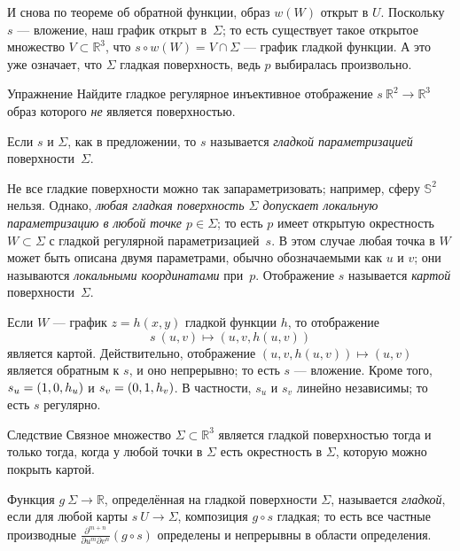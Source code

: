 И снова по теореме об обратной функции, образ $w(W)$ открыт в $U$.
Поскольку $s$ --- вложение, наш график открыт в~$\Sigma$;
то есть существует такое открытое множество $V\subset \mathbb{R}^3$, что $s\circ w(W)=V\cap \Sigma$ --- график гладкой функции.
А это уже означает, что $\Sigma$ гладкая поверхность, ведь $p$ выбиралась произвольно.
\qeds


\begin{thm}{Упражнение}\label{ex:9-surf}
Найдите гладкое регулярное инъективное отображение $s\:\mathbb{R}^2\to\mathbb{R}^3$ образ которого \textit{не} является поверхностью.
\end{thm}

Если $s$ и $\Sigma$, как в предложении, то $s$ называется \emph{гладкой параметризацией} поверхности~$\Sigma$. 

Не все гладкие поверхности можно так запараметризовать;
например, сферу $\mathbb{S}^2$ нельзя.
Однако, \textit{любая гладкая поверхность $\Sigma$ допускает локальную параметризацию в любой точке $p\in\Sigma$}; то есть $p$ имеет открытую окрестность $W\subset \Sigma$ с гладкой регулярной параметризацией~$s$.
В этом случае любая точка в $W$ может быть описана двумя параметрами, обычно обозначаемыми как $u$ и $v$;
они называются \emph{локальными координатами} при~$p$.
Отображение $s$ называется \emph{картой} поверхности~$\Sigma$.

Если $W$ --- график $z=h(x,y)$ гладкой функции $h$, то отображение 
\[s\:(u,v)\mapsto (u,v,h(u,v))\] является картой.
Действительно, отображение $(u,v,h(u,v))\mapsto (u,v)$ является обратным к $s$, и оно непрерывно;
то есть $s$ --- вложение.
Кроме того,
$s_u\z=(1,0,h_u)$ и $s_v\z=(0,1,h_v)$. 
В частности, $s_u$ и $s_v$ линейно независимы;
то есть $s$ регулярно.

\begin{thm}{Следствие}\label{cor:reg-parmeterization}
Связное множество $\Sigma\subset \mathbb{R}^3$ является гладкой поверхностью тогда и только тогда, когда у любой точки в $\Sigma$ есть 
окрестность в $\Sigma$, которую можно покрыть картой.
\end{thm}

Функция $g\: \Sigma \to \mathbb{R}$, определённая на гладкой поверхности $\Sigma$, называется \emph{гладкой}, если для любой карты $s \: U\to \Sigma$,
композиция $g\circ s$ гладкая; то есть все частные производные $\frac{\partial^{m+n}}{\partial u^m\partial v^n}(g\circ s)$ определены и непрерывны в области определения.


